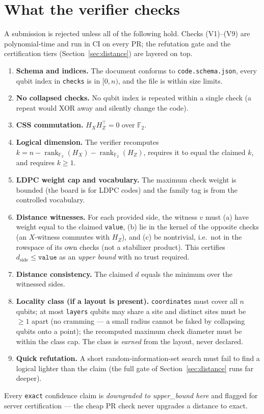 \documentclass[11pt]{article}
\newcommand{\GF}{\mathbb{F}_2}
\newcommand{\HX}{H_X}
\newcommand{\HZ}{H_Z}
\newcommand{\rank}{\operatorname{rank}}
\begin{document}
	\section{What the verifier checks}
	\label{sec:checks}

	A submission is rejected unless all of the following hold. Checks
	(V1)--(V9) are polynomial-time and run in CI on every PR; the refutation
	gate and the certification tiers (Section~\ref{sec:distance}) are layered
	on top.
	\begin{enumerate}[label=(V\arabic*),leftmargin=*,nosep]
		\item \textbf{Schema and indices.} The document conforms to
		\texttt{code.schema.json}, every qubit index in \texttt{checks} is in
		$[0,n)$, and the file is within size limits.
		\item \textbf{No collapsed checks.} No qubit index is repeated within
		a single check (a repeat would XOR away and silently change the code).
		\item \textbf{CSS commutation.} $\HX\HZ^{\!\top}=0$ over $\GF$.
		\item \textbf{Logical dimension.} The verifier recomputes
		$k = n-\rank_{\GF}(\HX)-\rank_{\GF}(\HZ)$, requires it to equal the
		claimed $k$, and requires $k\ge 1$.
		\item \textbf{LDPC weight cap and vocabulary.} The maximum check
		weight is bounded (the board is for LDPC codes) and the family tag is
		from the controlled vocabulary.
		\item \textbf{Distance witnesses.} For each provided side, the witness
		$v$ must (a) have weight equal to the claimed \texttt{value}, (b) lie
		in the kernel of the opposite checks (an $X$-witness commutes with
		$\HZ$), and (c) be nontrivial, i.e.\ not in the rowspace of its own
		checks (not a stabilizer product). This certifies
		$d_{\text{side}}\le\texttt{value}$ as an \emph{upper bound} with no
		trust required.
		\item \textbf{Distance consistency.} The claimed $d$ equals the
		minimum over the witnessed sides.
		\item \textbf{Locality class (if a layout is present).}
		\texttt{coordinates} must cover all $n$ qubits; at most
		\texttt{layers} qubits may share a site and distinct sites must be
		$\ge 1$ apart (no cramming --- a small radius cannot be faked by
		collapsing qubits onto a point); the recomputed maximum check diameter
		must be within the class cap. The class is \emph{earned} from the
		layout, never declared.
		\item \textbf{Quick refutation.} A short random-information-set
		search must fail to find a logical lighter than the claim (the full
		gate of Section~\ref{sec:distance} runs far deeper).
	\end{enumerate}
	Every \texttt{exact} confidence claim is \emph{downgraded to
	upper\_bound here} and flagged for server certification --- the cheap PR
	check never upgrades a distance to exact.
\end{document}
